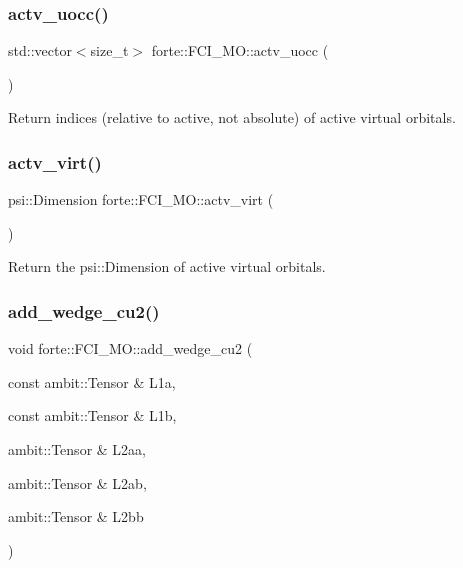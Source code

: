 \subsubsection{\texorpdfstring{actv\+\_\+uocc()}{actv\_uocc()}}
{\footnotesize\ttfamily std\+::vector$<$size\+\_\+t$>$ forte\+::\+F\+C\+I\+\_\+\+M\+O\+::actv\+\_\+uocc (\begin{DoxyParamCaption}{ }\end{DoxyParamCaption})\hspace{0.3cm}{\ttfamily [inline]}}



Return indices (relative to active, not absolute) of active virtual orbitals. 

\mbox{\label{classforte_1_1_f_c_i___m_o_ad99d13576ef1e965d1e3b6dd58109bba}} 
\subsubsection{\texorpdfstring{actv\+\_\+virt()}{actv\_virt()}}
{\footnotesize\ttfamily psi\+::\+Dimension forte\+::\+F\+C\+I\+\_\+\+M\+O\+::actv\+\_\+virt (\begin{DoxyParamCaption}{ }\end{DoxyParamCaption})\hspace{0.3cm}{\ttfamily [inline]}}



Return the psi\+::\+Dimension of active virtual orbitals. 

\mbox{\label{classforte_1_1_f_c_i___m_o_a0463ce4f890b492a7363ce261766d00a}} 
\subsubsection{\texorpdfstring{add\+\_\+wedge\+\_\+cu2()}{add\_wedge\_cu2()}}
{\footnotesize\ttfamily void forte\+::\+F\+C\+I\+\_\+\+M\+O\+::add\+\_\+wedge\+\_\+cu2 (\begin{DoxyParamCaption}\item[{const ambit\+::\+Tensor \&}]{L1a,  }\item[{const ambit\+::\+Tensor \&}]{L1b,  }\item[{ambit\+::\+Tensor \&}]{L2aa,  }\item[{ambit\+::\+Tensor \&}]{L2ab,  }\item[{ambit\+::\+Tensor \&}]{L2bb }\end{DoxyParamCaption})\hspace{0.3cm}{\ttfamily [protected]}}



